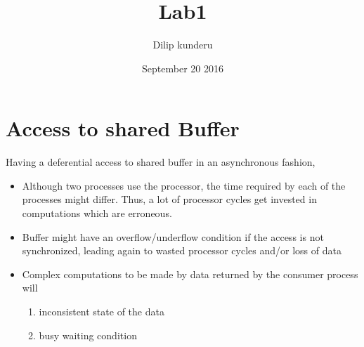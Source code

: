 \documentclass{article}
\title{\HUGE Lab1}
\author{\LARGE Dilip kunderu}
\date{\large September 20 2016}
\begin{document}
\maketitle

\newpage

\section{Access to shared Buffer}
Having a deferential access to shared buffer in an asynchronous fashion,

    \begin{itemize}
        \item Although two processes use the processor, the time required by each of the processes might differ. Thus, a lot of processor cycles get invested in computations which are erroneous.
        \item Buffer might have an overflow/underflow condition if the access is not synchronized, leading again to wasted processor cycles and/or loss of data
        \item Complex computations to be made by data returned by the consumer process will
            \begin{enumerate}
                \item inconsistent state of the data
                \item busy waiting condition 
            \end{enumerate}
    \end{itemize}
\end{document}
